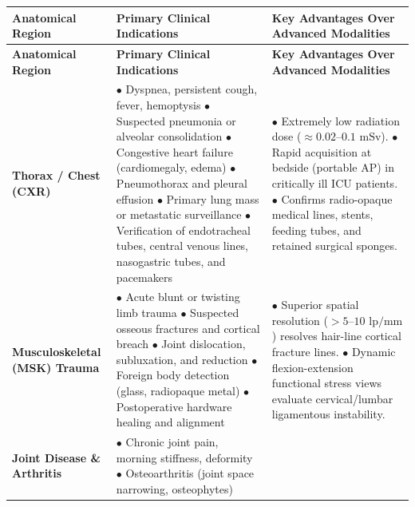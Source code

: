 \documentclass[11pt,a4paper]{article}
\begin{document}
\begin{longtable}{p{3.2cm}p{6cm}p{6cm}}
\toprule
\textbf{Anatomical Region} & \textbf{Primary Clinical Indications} & \textbf{Key Advantages Over Advanced Modalities} \\
\midrule
\endfirsthead
\toprule
\textbf{Anatomical Region} & \textbf{Primary Clinical Indications} & \textbf{Key Advantages Over Advanced Modalities} \\
\midrule
\endhead
\bottomrule
\endfoot
\textbf{Thorax / Chest (CXR)} & 
$\bullet$ Dyspnea, persistent cough, fever, hemoptysis\newline
$\bullet$ Suspected pneumonia or alveolar consolidation\newline
$\bullet$ Congestive heart failure (cardiomegaly, edema)\newline
$\bullet$ Pneumothorax and pleural effusion\newline
$\bullet$ Primary lung mass or metastatic surveillance\newline
$\bullet$ Verification of endotracheal tubes, central venous lines, nasogastric tubes, and pacemakers & 
$\bullet$ Extremely low radiation dose ($\approx 0.02\text{--}0.1\text{ mSv}$).\newline
$\bullet$ Rapid acquisition at bedside (portable AP) in critically ill ICU patients.\newline
$\bullet$ Confirms radio-opaque medical lines, stents, feeding tubes, and retained surgical sponges. \\
\midrule
\textbf{Musculoskeletal (MSK) Trauma} & 
$\bullet$ Acute blunt or twisting limb trauma\newline
$\bullet$ Suspected osseous fractures and cortical breach\newline
$\bullet$ Joint dislocation, subluxation, and reduction\newline
$\bullet$ Foreign body detection (glass, radiopaque metal)\newline
$\bullet$ Postoperative hardware healing and alignment & 
$\bullet$ Superior spatial resolution ($>5\text{--}10\text{ lp/mm}$) resolves hair-line cortical fracture lines.\newline
$\bullet$ Dynamic flexion-extension functional stress views evaluate cervical/lumbar ligamentous instability. \\
\midrule
\textbf{Joint Disease \& Arthritis} & 
$\bullet$ Chronic joint pain, morning stiffness, deformity\newline
$\bullet$ Osteoarthritis (joint space narrowing, osteophytes)\newline

\end{longtable}
\end{document}

